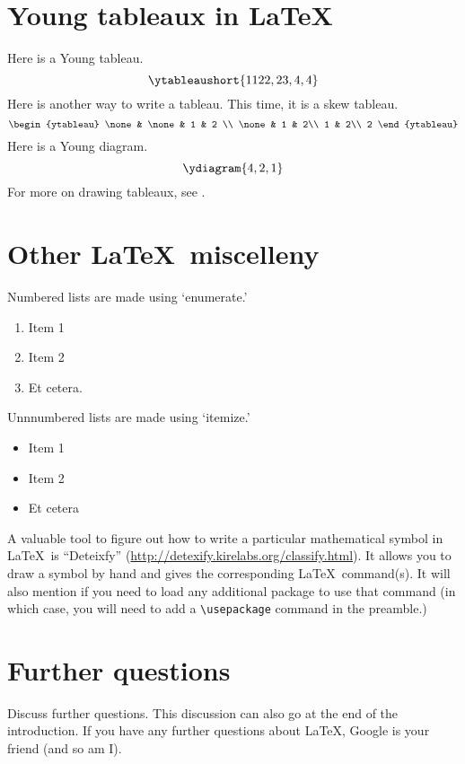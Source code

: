 \documentclass{article}
\begin{document}
\section{Young tableaux in \LaTeX}
Here is a Young tableau.
\[  \ytableaushort{1122,23,4,4} \]
Here is another way to write a tableau.
This time, it is a skew tableau.
\[
\begin{ytableau}
  \none & \none & 1 & 2 \\
  \none & 1 & 2\\
  1 & 2\\
  2
\end{ytableau}
\]
Here is a Young diagram.
\[
\ydiagram{4,2,1}
\]
For more on drawing tableaux, see \cite{reich}.

\section{Other \LaTeX\ miscelleny}
Numbered lists are made using `enumerate.'
\begin{enumerate}
\item Item 1
\item Item 2
\item Et cetera.
\end{enumerate}

Unnnumbered lists are made using `itemize.'
\begin{itemize}
\item Item 1
\item Item 2
\item Et cetera
\end{itemize}


A valuable tool to figure out how to write a particular mathematical symbol in \LaTeX\ is ``Deteixfy'' (\url{http://detexify.kirelabs.org/classify.html}).
It allows you to draw a symbol by hand and gives the corresponding \LaTeX\ command(s).
It will also mention if you need to load any additional package to use that command (in which case, you will need to add a \verb|\usepackage| command in the preamble.)

\section{Further questions}
Discuss further questions.
This discussion can also go at the end of the introduction.
If you have any further questions about \LaTeX, Google is your friend (and so am I).
\end{document}
